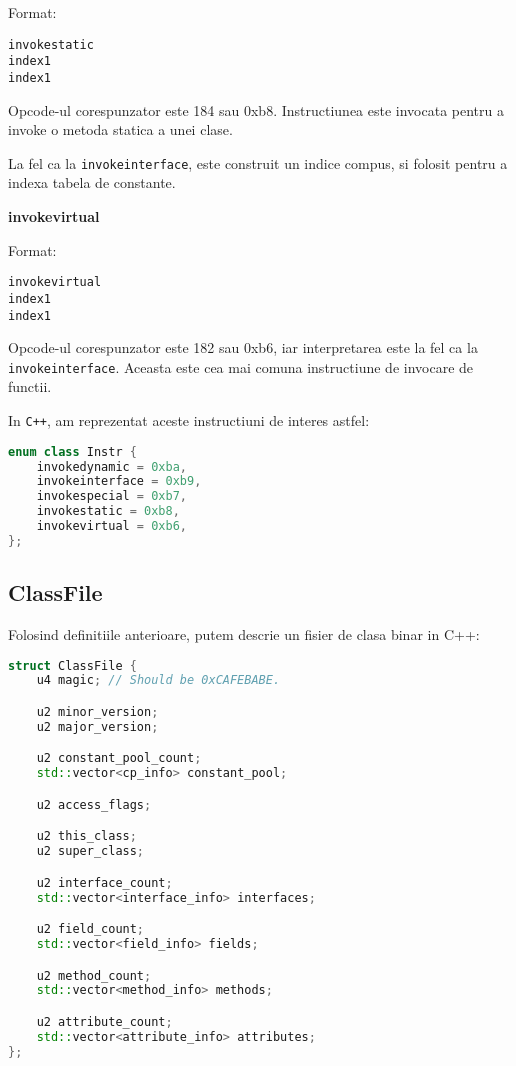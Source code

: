 Format:
\begin{verbatim}
invokestatic
index1
index1
\end{verbatim}

Opcode-ul corespunzator este 184 sau 0xb8.
Instructiunea este invocata pentru a invoke o metoda statica a unei
clase.

La fel ca la \texttt{invokeinterface}, este construit un indice compus,
si folosit pentru a indexa tabela de constante.

\textbf{invokevirtual}

Format:
\begin{verbatim}
invokevirtual
index1
index1
\end{verbatim}

Opcode-ul corespunzator este 182 sau 0xb6, iar
interpretarea este la fel ca la \texttt{invokeinterface}.
Aceasta este cea mai comuna instructiune de invocare de functii.

In \texttt{C++}, am reprezentat aceste instructiuni de interes astfel:

\begin{lstlisting}[language=C++]
enum class Instr {
    invokedynamic = 0xba,
    invokeinterface = 0xb9,
    invokespecial = 0xb7,
    invokestatic = 0xb8,
    invokevirtual = 0xb6,
};
\end{lstlisting}

\subsection{ClassFile}\label{classfile}

Folosind definitiile anterioare, putem descrie un fisier de clasa binar
in C++:

\begin{lstlisting}[language=C++]
struct ClassFile {
    u4 magic; // Should be 0xCAFEBABE.

    u2 minor_version;
    u2 major_version;

    u2 constant_pool_count;
    std::vector<cp_info> constant_pool;

    u2 access_flags;

    u2 this_class;
    u2 super_class;

    u2 interface_count;
    std::vector<interface_info> interfaces;

    u2 field_count;
    std::vector<field_info> fields;

    u2 method_count;
    std::vector<method_info> methods;

    u2 attribute_count;
    std::vector<attribute_info> attributes;
};
\end{lstlisting}

